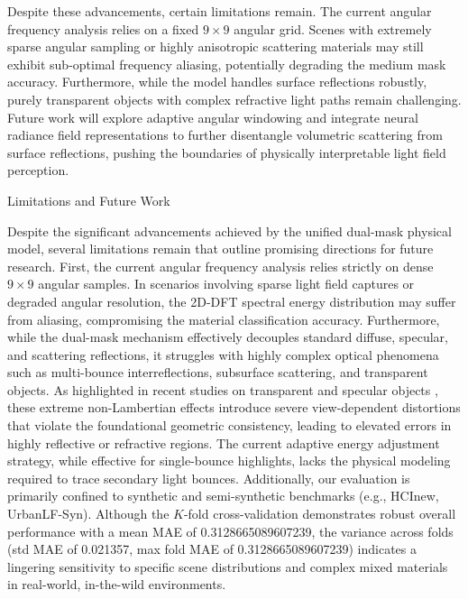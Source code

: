 \documentclass[lettersize,journal]{IEEEtran}
\begin{document}
Despite these advancements, certain limitations remain. The current angular frequency analysis relies on a fixed $9 \times 9$ angular grid. Scenes with extremely sparse angular sampling or highly anisotropic scattering materials may still exhibit sub-optimal frequency aliasing, potentially degrading the medium mask accuracy. Furthermore, while the model handles surface reflections robustly, purely transparent objects with complex refractive light paths remain challenging. Future work will explore adaptive angular windowing and integrate neural radiance field representations \cite{ng2022} to further disentangle volumetric scattering from surface reflections, pushing the boundaries of physically interpretable light field perception.

Limitations and Future Work

Despite the significant advancements achieved by the unified dual-mask physical model, several limitations remain that outline promising directions for future research. First, the current angular frequency analysis relies strictly on dense $9 \times 9$ angular samples. In scenarios involving sparse light field captures or degraded angular resolution, the 2D-DFT spectral energy distribution may suffer from aliasing, compromising the material classification accuracy. Furthermore, while the dual-mask mechanism effectively decouples standard diffuse, specular, and scattering reflections, it struggles with highly complex optical phenomena such as multi-bounce interreflections, subsurface scattering, and transparent objects. As highlighted in recent studies on transparent and specular objects \cite{zhang2023}, these extreme non-Lambertian effects introduce severe view-dependent distortions that violate the foundational geometric consistency, leading to elevated errors in highly reflective or refractive regions. The current adaptive energy adjustment strategy, while effective for single-bounce highlights, lacks the physical modeling required to trace secondary light bounces. Additionally, our evaluation is primarily confined to synthetic and semi-synthetic benchmarks (e.g., HCInew, UrbanLF-Syn). Although the $K$-fold cross-validation demonstrates robust overall performance with a mean MAE of 0.3128665089607239, the variance across folds (std MAE of 0.021357, max fold MAE of 0.3128665089607239) indicates a lingering sensitivity to specific scene distributions and complex mixed materials in real-world, in-the-wild environments.
\end{document}
